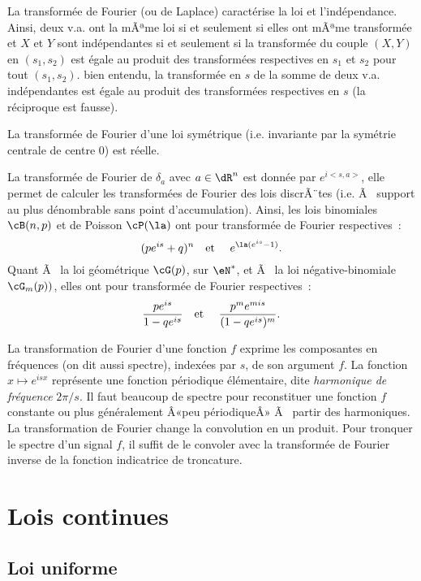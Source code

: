 {{La transformée de Fourier (ou de Laplace) caractérise la loi et
l'indépendance. Ainsi, deux v.a. ont la mÃªme loi si et seulement si elles ont
mÃªme transformée et $X$ et $Y$ sont indépendantes si et seulement si la
transformée du couple $(X,Y)$ en $(s_1,s_2)$ est égale au produit des
transformées respectives en $s_1$ et $s_2$ pour tout $(s_1,s_2)$. bien
entendu, la transformée en $s$ de la somme de deux v.a. indépendantes est
égale au produit des transformées respectives en $s$ (la réciproque est
fausse).

La transformée de Fourier d'une loi symétrique (i.e. invariante par la
symétrie centrale de centre $0$) est réelle.

La transformée de Fourier de $\delta_a$ avec $a\in\dR^n$ est donnée par
$e^{i<s,a>}$, elle permet de calculer les transformées de Fourier des lois
discrÃ¨tes (i.e. Ã  support au plus dénombrable sans point d'accumulation).
Ainsi, les lois binomiales $\cB(n,p)$ et de Poisson $\cP(\la)$ ont pour
transformée de Fourier respectives~:
$$
(pe^{is}+q)^n
\text{\quad et \quad}
e^{\la(e^{is}-1)}.
$$
Quant Ã  la loi géométrique $\cG(p)$, sur $\eN^*$, et Ã  la loi
négative-binomiale $\cG_m(p))$, elles ont pour transformée de Fourier
respectives~:
$$
\frac{pe^{is}}{1-qe^{is}}
\text{\quad et \quad}
\frac{p^me^{mis}}{(1-qe^{is})^m}.
$$

\begin{eur}[Transformation de Fourier = analyse en fréquences]
  La transformation de Fourier d'une fonction $f$ exprime les composantes en
  fréquences (on dit aussi spectre), indexées par $s$, de son argument $f$.
  La fonction $x\mapsto e^{isx}$ représente une fonction périodique
  élémentaire, dite \emph{harmonique de fréquence} $2\pi/s$. Il faut beaucoup
  de spectre pour reconstituer une fonction $f$ constante ou plus généralement
  Â«peu périodiqueÂ» Ã  partir des harmoniques.  La transformation de Fourier
  change la convolution en un produit.  Pour tronquer le spectre d'un signal
  $f$, il suffit de le convoler avec la transformée de Fourier inverse de la
  fonction indicatrice de troncature.
\end{eur}

%
\section{Lois continues}
%

%
\subsection{Loi uniforme}\label{ss:loi:uniforme}
%

}}
